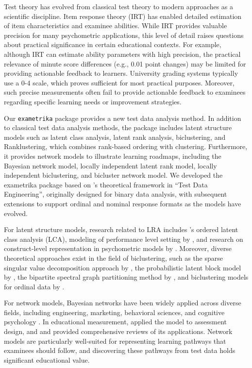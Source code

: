 Test theory has evolved from classical test theory to modern approaches as a scientific discipline. Item response theory (IRT) has enabled detailed estimation of item characteristics and examinee abilities. While IRT provides valuable precision for many psychometric applications, this level of detail raises questions about practical significance in certain educational contexts. For example, although IRT can estimate ability parameters with high precision, the practical relevance of minute score differences (e.g., 0.01 point changes) may be limited for providing actionable feedback to learners. University grading systems typically use a 0-4 scale, which proves sufficient for most practical purposes. Moreover, such precise measurements often fail to provide actionable feedback to examinees regarding specific learning needs or improvement strategies.

Our \texttt{exametrika} package provides a new test data analysis method. In addition to classical test data analysis methods, the package includes latent structure models such as latent class analysis, latent rank analysis, biclustering, and Ranklustering, which combines rank-based ordering with clustering. Furthermore, it provides network models to illustrate learning roadmaps, including the Bayesian network model, locally independent latent rank model, locally independent biclustering, and bicluster network model. We developed the exametrika package based on \citet{shojima}'s theoretical framework in ``Test Data Engineering'', originally designed for binary data analysis, with subsequent extensions to support ordinal and nominal response formats as the models have evolved.

For latent structure models, research related to LRA includes \citet{croon1990latent}'s ordered latent class analysis (LCA), modeling of performance level setting by \citet{torres2015modeling}, and research on construct-level representation in psychometric models by \citet{diakow2014construct}. Moreover, diverse theoretical approaches exist in the field of biclustering, such as the sparse singular value decomposition approach by \citet{lee2010biclustering}, the probabilistic latent block model by \citet{govaert2010latent}, the bipartite spectral graph partitioning method by \citet{dhillon2001co}, and biclustering models for ordinal data by \citet{matechou2016biclustering}.

For network models, Bayesian networks have been widely applied across diverse fields, including engineering, marketing, behavioral sciences, and cognitive psychology \citep{pearl1988probabilistic, jensen2007bayesian, darwiche2009modeling, koski2009bayesian, scutari2014bayesian}. In educational measurement, \citet{almond2015bayesian} applied the model to assessment design, and \citet{culbertson2016bayesian} and \citet{reichenberg2018dynamic} provided comprehensive reviews of its applications. Network models are particularly well-suited for representing learning pathways that examinees should follow, and discovering these pathways from test data holds significant educational value.

